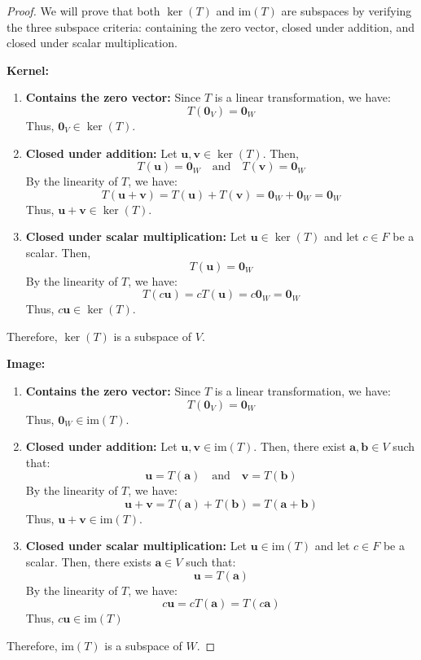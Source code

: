 \documentclass[openany]{book}
\begin{document}
\begin{proof}
    We will prove that both $\ker(T)$ and $\text{im}(T)$ are subspaces by verifying the three subspace criteria: containing the zero vector, closed under addition, and closed under scalar multiplication.

    \textbf{Kernel:}
    \begin{enumerate}
        \item \textbf{Contains the zero vector:} Since $T$ is a linear transformation, we have:
        $$T(\mathbf{0}_V) = \mathbf{0}_W$$
        Thus, $\mathbf{0}_V \in \ker(T)$.

        \item \textbf{Closed under addition:} Let $\mathbf{u}, \mathbf{v} \in \ker(T)$. Then,
        $$T(\mathbf{u}) = \mathbf{0}_W \quad \text{and} \quad T(\mathbf{v}) = \mathbf{0}_W$$
        By the linearity of $T$, we have:
        $$T(\mathbf{u} + \mathbf{v}) = T(\mathbf{u}) + T(\mathbf{v}) = \mathbf{0}_W + \mathbf{0}_W = \mathbf{0}_W$$
        Thus, $\mathbf{u} + \mathbf{v} \in \ker(T)$.

        \item \textbf{Closed under scalar multiplication:} Let $\mathbf{u} \in \ker(T)$ and let $c \in F$ be a scalar. Then,
        $$T(\mathbf{u}) = \mathbf{0}_W$$
        By the linearity of $T$, we have:
        $$T(c\mathbf{u}) = cT(\mathbf{u}) = c\mathbf{0}_W = \mathbf{0}_W$$
        Thus, $c\mathbf{u} \in \ker(T)$.
    \end{enumerate}
    Therefore, $\ker(T)$ is a subspace of $V$.

    \textbf{Image:}
    \begin{enumerate}
        \item \textbf{Contains the zero vector:} Since $T$ is a linear transformation, we have:
        $$T(\mathbf{0}_V) = \mathbf{0}_W$$
        Thus, $\mathbf{0}_W \in \text{im}(T)$.

        \item \textbf{Closed under addition:} Let $\mathbf{u}, \mathbf{v} \in \text{im}(T)$. Then, there exist $\mathbf{a}, \mathbf{b} \in V$ such that:
        $$\mathbf{u} = T(\mathbf{a}) \quad \text{and} \quad \mathbf{v} = T(\mathbf{b})$$
        By the linearity of $T$, we have:
        $$\mathbf{u} + \mathbf{v} = T(\mathbf{a}) + T(\mathbf{b}) = T(\mathbf{a} + \mathbf{b})$$
        Thus, $\mathbf{u} + \mathbf{v} \in \text{im}(T)$.
        \item \textbf{Closed under scalar multiplication:} Let $\mathbf{u} \in \text{im}(T)$ and let $c \in F$ be a scalar. Then, there exists $\mathbf{a} \in V$ such that:
        $$\mathbf{u} = T(\mathbf{a})$$
        By the linearity of $T$, we have:
        $$c\mathbf{u} = cT(\mathbf{a}) = T(c\mathbf{a})$$
        Thus, $c\mathbf{u} \in \text{im}(T)$
    \end{enumerate}
    Therefore, $\text{im}(T)$ is a subspace of $W$.
\end{proof}
\end{document}
